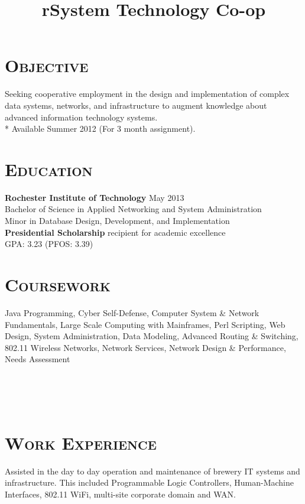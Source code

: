 \begin{resume}


\section{\textsc{Objective}}
Seeking cooperative employment in the design and implementation of complex data systems, networks, and infrastructure to augment knowledge about advanced information technology systems. \\*
Available Summer 2012 (For 3 month assignment).
\section{\textsc{Education}}

\textbf{Rochester Institute of Technology} \hfill May 2013 \\
Bachelor of Science in Applied Networking and System Administration \\
Minor in Database Design, Development, and Implementation \\
{\bf Presidential Scholarship} recipient for academic excellence \\
GPA: 3.23 (PFOS: 3.39)

\section{\textsc{Coursework}}

Java Programming, Cyber Self-Defense, Computer System \& Network Fundamentals, Large Scale Computing with Mainframes, Perl Scripting, Web Design, System Administration, Data Modeling, Advanced Routing \& Switching, 802.11 Wireless Networks, Network Services, Network Design \& Performance, Needs Assessment

\begin{formatb}
  \title{r}\\
  \\
  \body\\
\end{formatb}

\section{\textsc{Work Experience}}

\title{System Technology Co-op}
\begin{position}
Assisted in the day to day operation and maintenance of brewery IT systems and infrastructure. This included Programmable Logic Controllers, Human-Machine Interfaces, 802.11 WiFi, multi-site corporate domain and WAN.
\end{position}


\end{resume}
